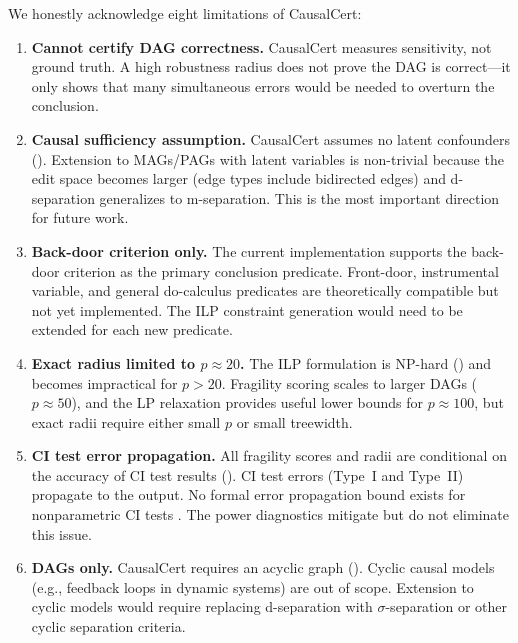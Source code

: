 \documentclass[11pt,a4paper]{article}
\theoremstyle{definition}
\theoremstyle{remark}
\begin{document}
We honestly acknowledge eight limitations of CausalCert:

\begin{enumerate}
\item \textbf{Cannot certify DAG correctness.} CausalCert measures sensitivity, not
  ground truth. A high robustness radius does not prove the DAG is correct---it only
  shows that many simultaneous errors would be needed to overturn the conclusion.

\item \textbf{Causal sufficiency assumption.} CausalCert assumes no latent confounders
  (). Extension to MAGs/PAGs with latent variables is non-trivial
  because the edit space becomes larger (edge types include bidirected edges) and
  d-separation generalizes to m-separation. This is the most important direction for
  future work.

\item \textbf{Back-door criterion only.} The current implementation supports the
  back-door criterion as the primary conclusion predicate. Front-door, instrumental
  variable, and general do-calculus predicates are theoretically compatible but not
  yet implemented. The ILP constraint generation would need to be extended for each
  new predicate.

\item \textbf{Exact radius limited to $p \approx 20$.} The ILP formulation is NP-hard
  () and becomes impractical for $p > 20$. Fragility scoring scales
  to larger DAGs ($p \approx 50$), and the LP relaxation provides useful lower bounds
  for $p \approx 100$, but exact radii require either small $p$ or small treewidth.

\item \textbf{CI test error propagation.} All fragility scores and radii are conditional
  on the accuracy of CI test results (). CI test errors (Type~I and
  Type~II) propagate to the output. No formal error propagation bound exists for
  nonparametric CI tests \cite{shah2020}. The power diagnostics mitigate but do not
  eliminate this issue.

\item \textbf{DAGs only.} CausalCert requires an acyclic graph ().
  Cyclic causal models (e.g., feedback loops in dynamic systems) are out of scope.
  Extension to cyclic models would require replacing d-separation with $\sigma$-separation
  or other cyclic separation criteria.


\end{enumerate}
\end{document}
